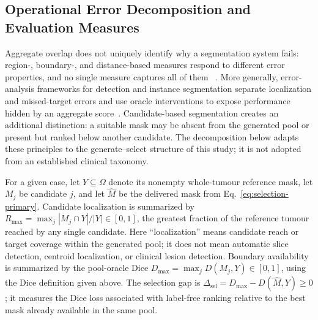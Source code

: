 \documentclass[11pt,a4paper]{article}
\begin{document}
\subsection{Operational Error Decomposition and Evaluation Measures}\label{sec:eval}

Aggregate overlap does not uniquely identify why a segmentation system fails:
region-, boundary-, and distance-based measures respond to different error
properties, and no single measure captures all of them
~\cite{taha2015,yeghiazaryan2018}. More generally, error-analysis frameworks for
detection and instance segmentation separate localization and missed-target
errors and use oracle interventions to expose performance hidden by an aggregate
score~\cite{bolya2020}. Candidate-based segmentation creates an additional
distinction: a suitable mask may be absent from the generated pool or present
but ranked below another candidate. The decomposition below adapts these
principles to the generate--select structure of this study; it is not adopted
from an established clinical taxonomy.

For a given case, let $Y\subseteq\Omega$ denote its nonempty whole-tumour
reference mask, let $M_j$ be candidate $j$, and let $\widehat M$ be the delivered
mask from Eq.~\eqref{eq:selection-primary}. Candidate localization is summarized by
$R_{\max}=\max_j|M_j\cap Y|/|Y|\in[0,1]$, the greatest fraction of the reference
tumour reached by any single candidate. Here ``localization'' means candidate
reach or target coverage within the generated pool; it does not mean automatic
slice detection, centroid localization, or clinical lesion detection. Boundary
availability is summarized by
the pool-oracle Dice $D_{\max}=\max_jD(M_j,Y)\in[0,1]$, using the Dice definition
given above. The selection gap is
$\Delta_{\mathrm{sel}}=D_{\max}-D(\widehat M,Y)\ge0$; it measures the Dice loss
associated with label-free ranking relative to the best mask already available
in the same pool.
\end{document}
